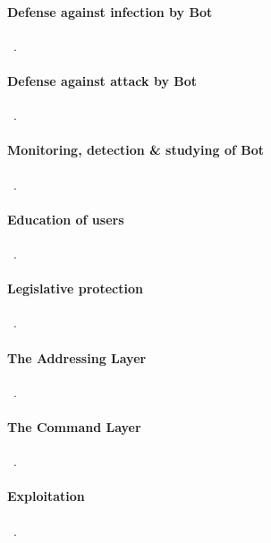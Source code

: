 


\paragraph{Defense against infection by Bot}
~\cite{stankovic2009defense}.



\paragraph{Defense against attack by Bot}
~\cite{stankovic2009defense}.



\paragraph{Monitoring, detection & studying of Bot}
~\cite{stankovic2009defense}.


\paragraph{Education of users}
~\cite{stankovic2009defense}.


\paragraph{Legislative protection}
~\cite{stankovic2009defense}.


\paragraph{The Addressing Layer}
~\cite{leder2009proactive}.


\paragraph{The Command Layer}
~\cite{leder2009proactive}.


\paragraph{Exploitation}
~\cite{leder2009proactive}.


